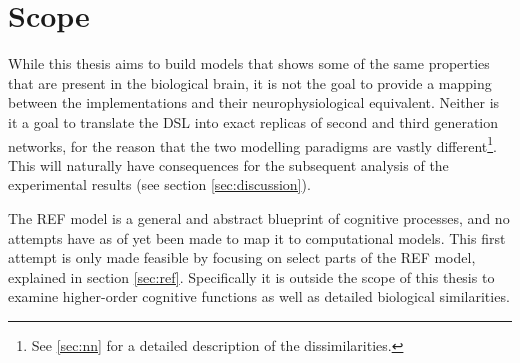 \documentclass[report.tex]{subfiles}
\begin{document}
\section{Scope} \label{sec:scope}
While this thesis aims to build models that shows some of the same
properties that are present in the biological brain,  
it is not the goal to provide a mapping between the
implementations and their neurophysiological equivalent.
Neither is it a goal to translate the \gls{DSL} into exact replicas
of second and third generation networks, for the reason that the
two modelling paradigms are vastly different\footnote{See \ref{sec:nn}
for a detailed description of the dissimilarities.}.
This will naturally have consequences for the subsequent analysis of the
experimental results (see section \ref{sec:discussion}).

The \gls{REF} model is a general and abstract blueprint of cognitive
processes, and no attempts have as of yet been made to map it to
computational models.
This first attempt is only made feasible by focusing on select parts
of the \gls{REF} model, explained in section \ref{sec:ref}.
Specifically it is outside the scope of this thesis to examine
higher-order cognitive functions as well as detailed biological
similarities.
\end{document}
